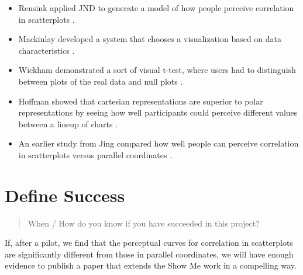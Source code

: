 \documentclass{proc}
\begin{document}
\begin{itemize}
  \item Rensink applied JND to generate a model of how people perceive correlation in scatterplots \cite{Rensink2010}.  \item Mackinlay developed a system that chooses a visualization based on data characteristics \cite{Mackinlay2007}.
  \item Wickham demonstrated a sort of visual t-test, where users had to distinguish between plots of the real data and null plots \cite{Wickham2010}.
  \item Hoffman showed that cartesian representations are superior to polar representations by seeing how well participants could perceive different values between a lineup of charts \cite{Hofmann2012}.
  \item An earlier study from Jing compared how well people can perceive correlation in scatterplots versus parallel coordinates \cite{Li2010}.
\end{itemize}

\section{Define Success}
\begin{quote}
When / How do you know if you have succeeded in this project?
\end{quote}

If, after a pilot, we find that the perceptual curves for correlation in scatterplots are significantly different from those in parallel coordinates, we will have enough evidence to publish a paper that extends the Show Me work in a compelling way.



\end{document}
